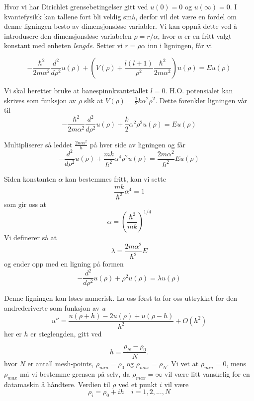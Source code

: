 \documentclass{article}
\begin{document}
Hvor vi har Dirichlet grensebetingelser gitt ved $u(0) = 0$ og $u(\infty) = 0$. I kvantefysikk kan tallene fort bli veldig små, derfor vil det være en fordel om denne ligningen besto av dimensjonsløse variabler. Vi kan oppnå dette ved å introdusere den dimensjonsløse variabelen $\rho = r/\alpha$, hvor $\alpha$ er en fritt valgt konstant med enheten \textit{lengde}. Setter vi $r = \rho \alpha$ inn i ligningen, får vi

\begin{equation}
  -\frac{\hbar^2}{2 m \alpha^2} \frac{d^2}{d\rho^2} u(\rho) 
       + \left ( V(\rho) + \frac{l (l + 1)}{\rho^2}
         \frac{\hbar^2}{2 m\alpha^2} \right ) u(\rho)  = E u(\rho)
\end{equation} 

Vi skal heretter bruke at banespinnkvantetallet $l = 0$. H.O. potensialet kan skrives som funksjon av $\rho$ slik at $V(\rho) = \frac{1}{2}k\alpha^2\rho^2$. Dette forenkler ligningen vår til
\begin{equation}
  -\frac{\hbar^2}{2 m \alpha^2} \frac{d^2}{d\rho^2} u(\rho) 
       + \frac{k}{2} \alpha^2\rho^2u(\rho)  = E u(\rho)
\end{equation}

Multipliserer så leddet $\frac{2m\alpha^2}{\hbar}$ på hver side av ligningen og får
\begin{equation}
  -\frac{d^2}{d\rho^2} u(\rho) 
       + \frac{mk}{\hbar^2} \alpha^4\rho^2u(\rho)  = \frac{2m\alpha^2}{\hbar^2}E u(\rho)
\end{equation}

Siden konstanten $\alpha$ kan bestemmes fritt, kan vi sette 
\[\frac{mk}{\hbar^2}\alpha^4 = 1 \]
som gir oss at
\[\alpha = \left(\frac{\hbar^2}{mk} \right)^{1/4} \]
Vi definerer så at
\[\lambda = \frac{2m\alpha^2}{\hbar^2}E \]
og ender opp med en ligning på formen
\begin{equation}
  -\frac{d^2}{d\rho^2} u(\rho) + \rho^2u(\rho)  = \lambda u(\rho)
\end{equation}

Denne ligningen kan løses numerisk. La oss først ta for oss uttrykket for den andrederiverte som funksjon av $u$
\begin{equation}
    u''=\frac{u(\rho+h) -2u(\rho) +u(\rho-h)}{h^2} +O(h^2)
\end{equation}
her er $h$ er steglengden, gitt ved

\begin{equation}
  h=\frac{\rho_N-\rho_0 }{N}.
\end{equation}
hvor $N$ er antall mesh-points, $\rho_{min} = \rho_0$ og $\rho_{max} = \rho_N$. Vi vet at $\rho_{min} = 0$, mens $\rho_{max}$ må vi bestemme grensen på selv, da $\rho_{max} = \infty$ vil være litt vanskelig for en datamaskin å håndtere. Verdien til $\rho$ ved et punkt $i$ vil være
\[\rho_i = \rho_0 + ih \quad i = 1,2,...,N \]
\end{document}
